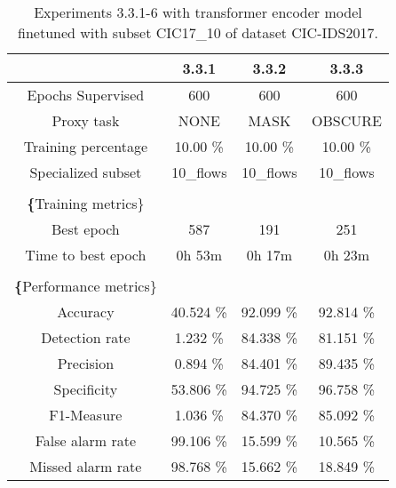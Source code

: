 \begin{table}[htb]
    \centering
    \begin{tabular}{@{}cccc@{}}
        \toprule
         & 3.3.1 & 3.3.2 & 3.3.3 \\
        \midrule
        Epochs Supervised &  600 &  600 &  600 \\
        Proxy task &  NONE &  MASK &  OBSCURE \\
        Training percentage &  10.00 \% &  10.00 \% &  10.00 \% \\
        Specialized subset &  10\_flows &  10\_flows &  10\_flows \\
         \\
        \textbf\{Training metrics\} &  &  &  \\
        Best epoch &  587 &  191 &  251 \\
        Time to best epoch &  0h 53m &  0h 17m &  0h 23m \\
         \\
        \textbf\{Performance metrics\} &  &  &  \\
        Accuracy &  40.524 \% &  92.099 \% &  92.814 \% \\
        Detection rate &  1.232 \% &  84.338 \% &  81.151 \% \\
        Precision &  0.894 \% &  84.401 \% &  89.435 \% \\
        Specificity &  53.806 \% &  94.725 \% &  96.758 \% \\
        F1-Measure &  1.036 \% &  84.370 \% &  85.092 \% \\
        False alarm rate &  99.106 \% &  15.599 \% &  10.565 \% \\
        Missed alarm rate &  98.768 \% &  15.662 \% &  18.849 \% \\
        \bottomrule
    \end{tabular}
    \caption{Experiments 3.3.1-6 with transformer encoder model finetuned with subset CIC17\_10 of dataset CIC-IDS2017.}
    \label{table:results:lstm:stats_flows_subset}
\end{table}
